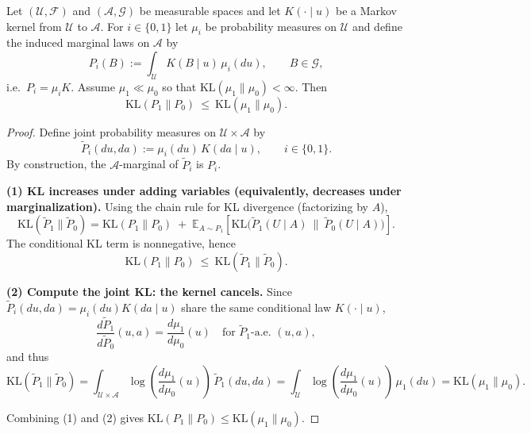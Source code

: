 \documentclass[10pt,a4paper]{amsart}
\begin{document}
\begin{lemma}
	\label{lem:dp_kl_markov_kernel}
	Let $(\mathcal U,\mathcal F)$ and $(\mathcal A,\mathcal G)$ be measurable spaces and
	let $K(\cdot\mid u)$ be a Markov kernel from $\mathcal U$ to $\mathcal A$.
	For $i\in\{0,1\}$ let $\mu_i$ be probability measures on $\mathcal U$ and define the induced
	marginal laws on $\mathcal A$ by
	\[
	P_i(B) := \int_{\mathcal U} K(B\mid u)\,\mu_i(du),
	\qquad B\in\mathcal G,
	\]
	i.e.\ $P_i = \mu_i K$.
	Assume $\mu_1\ll \mu_0$ so that $\mathrm{KL}(\mu_1\|\mu_0)<\infty$.
	Then
	\[
	\mathrm{KL}(P_1\|P_0)\ \le\ \mathrm{KL}(\mu_1\|\mu_0).
	\]
\end{lemma}

\begin{proof}
	Define joint probability measures on $\mathcal U\times \mathcal A$ by
	\[
	\widetilde P_i(du,da) := \mu_i(du)\,K(da\mid u),
	\qquad i\in\{0,1\}.
	\]
	By construction, the $\mathcal A$-marginal of $\widetilde P_i$ is $P_i$.
	
	\smallskip
	\noindent\textbf{(1) KL increases under adding variables (equivalently, decreases under marginalization).}
	Using the chain rule for KL divergence (factorizing by $A$),
	\[
	\mathrm{KL}(\widetilde P_1\|\widetilde P_0)
	=
	\mathrm{KL}(P_1\|P_0)
	\;+\;
	\mathbb E_{A\sim P_1}\!\left[
	\mathrm{KL}\big(\widetilde P_1(U\mid A)\ \|\ \widetilde P_0(U\mid A)\big)
	\right].
	\]
	The conditional KL term is nonnegative, hence
	\[
	\mathrm{KL}(P_1\|P_0)\ \le\ \mathrm{KL}(\widetilde P_1\|\widetilde P_0).
	\]
	
	\smallskip
	\noindent\textbf{(2) Compute the joint KL: the kernel cancels.}
	Since $\widetilde P_i(du,da)=\mu_i(du)K(da\mid u)$ share the same conditional law $K(\cdot\mid u)$,
	\[
	\frac{d\widetilde P_1}{d\widetilde P_0}(u,a)=\frac{d\mu_1}{d\mu_0}(u)
	\quad\text{for }\widetilde P_1\text{-a.e. }(u,a),
	\]
	and thus
	\[
	\mathrm{KL}(\widetilde P_1\|\widetilde P_0)
	=
	\int_{\mathcal U\times\mathcal A}
	\log\!\left(\frac{d\mu_1}{d\mu_0}(u)\right)\,\widetilde P_1(du,da)
	=
	\int_{\mathcal U}
	\log\!\left(\frac{d\mu_1}{d\mu_0}(u)\right)\,\mu_1(du)
	=
	\mathrm{KL}(\mu_1\|\mu_0).
	\]
	
	\smallskip
	Combining (1) and (2) gives $\mathrm{KL}(P_1\|P_0)\le \mathrm{KL}(\mu_1\|\mu_0)$.
\end{proof}
\end{document}
